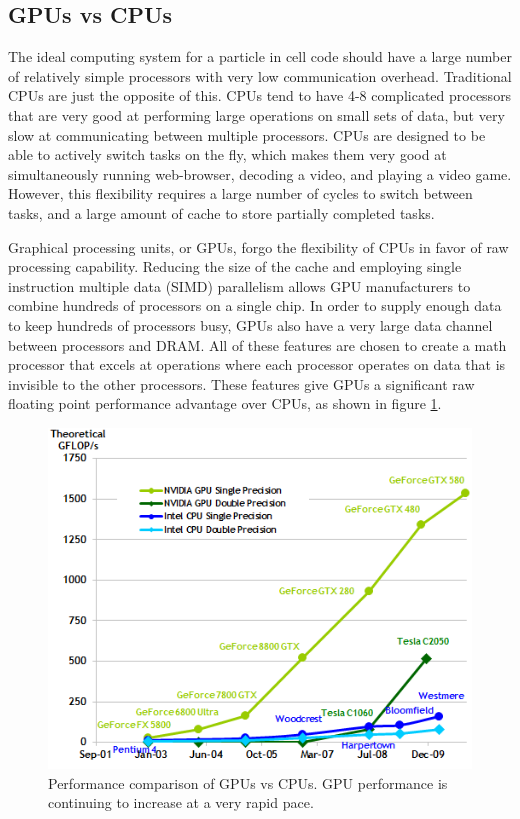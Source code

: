 		\subsection{GPUs vs CPUs}
	The ideal computing system for a particle in cell code should have a large number of relatively simple processors with very low communication overhead. Traditional CPUs are just the opposite of this. CPUs tend to have 4-8 complicated processors that are very good at performing large operations on small sets of data, but very slow at communicating between multiple processors. CPUs are designed to be able to actively switch tasks on the fly, which makes them very good at simultaneously running web-browser, decoding a video, and playing a video game. However, this flexibility requires a large number of cycles to switch between tasks, and a large amount of cache to store partially completed tasks.

Graphical processing units, or GPUs, forgo the flexibility of CPUs in favor of raw processing capability. Reducing the size of the cache and employing single instruction multiple data (SIMD) parallelism allows GPU manufacturers to combine hundreds of processors on a single chip. In order to supply enough data to keep hundreds of processors busy, GPUs also have a very large data channel between processors and DRAM. All of these features are chosen to create a math processor that excels at operations where each processor operates on data that is invisible to the other processors. These features give GPUs a significant raw floating point performance advantage over CPUs, as shown in figure \ref{fig:gpu_vs_cpu}. 


\begin{figure}
\begin{center}
\includegraphics[width=5in]{introduction/gpu_vs_cpu.png}
\end{center}
\caption[Performance comparison of GPUs vs CPUs.]{Performance comparison of GPUs vs CPUs. GPU performance is continuing to increase at a very rapid pace.\cite{NVIDIACorporation2011}}
\label{fig:gpu_vs_cpu}
\end{figure}

